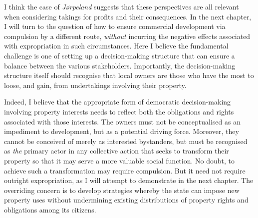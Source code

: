 {{I think the case of \emph{Jørpeland} suggests that these perspectives are all relevant when considering takings for profits and their consequences. In the next chapter, I will turn to the question of how to ensure commercial development via compulsion by a different route, {\it without} incurring the negative effects associated with expropriation in such circumstances. Here I believe the fundamental challenge is one of setting up a decision-making structure that can ensure a balance between the various stakeholders. Importantly, the decision-making structure itself should recognise that local owners are those who have the most to loose, and gain, from undertakings involving their property. 

Indeed, I believe that the appropriate form of democratic decision-making involving property interests needs to reflect both the obligations and rights associated with those interests. The owners must not be conceptualised as an impediment to development, but as a potential driving force. Moreover, they cannot be conceived of merely as interested bystanders, but must be recognised as {\it the} primary actor in any collective action that seeks to transform their property so that it may serve a more valuable social function. No doubt, to achieve such a transformation may require compulsion. But it need not require outright expropriation, as I will attempt to demonstrate in the next chapter. The overriding concern is to develop strategies whereby the state can impose new property uses without undermining existing distributions of property rights and obligations among its citizens.
} }
 
